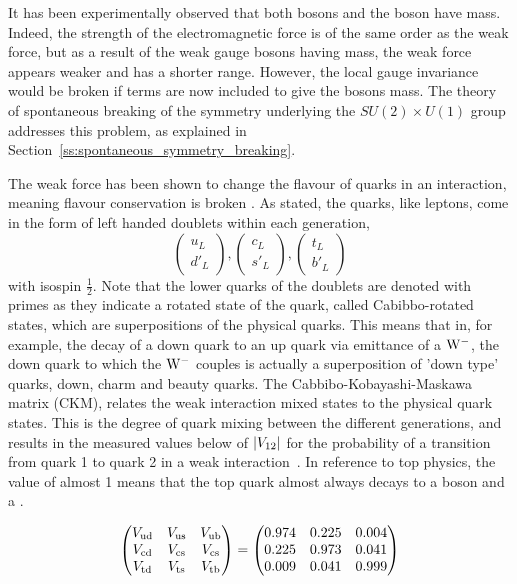 It has been experimentally observed that both \W bosons and the \Z boson have mass. Indeed, the
strength of the electromagnetic force is of the same order as the weak force, but as a result of the weak
gauge bosons having mass, the weak force appears weaker and has a shorter range. However, the local gauge
invariance would be broken if terms are now included to give the bosons mass. The theory of spontaneous
breaking of the symmetry underlying the $SU(2) \times U(1)$ group addresses this problem, as explained in
Section~\ref{ss:spontaneous_symmetry_breaking}.

The weak force has been shown to change the flavour of quarks in an interaction, meaning flavour conservation
is broken \cite{}. As stated, the quarks, like leptons, come in the form of left handed doublets within each
generation,
\begin{equation}
\left(\begin{array}{c} u_{L} \\ d'_{L} \end{array}\right) , \left(\begin{array}{c} c_{L} \\ 
s'_{L} \end{array}\right) , \left(\begin{array}{c} t_{L} \\ b'_{L} \end{array}\right)
\end{equation}
with isospin $\frac{1}{2}$. Note that the lower quarks of the doublets are denoted with primes as they
indicate a rotated state of the quark, called Cabibbo-rotated states, which are superpositions of the physical quarks.
This means that in, for example, the decay of a down quark to an up quark via emittance of a $\mathrm{W}^{-}$, the
down quark to which the $\mathrm{W}^{-}$ couples is actually a superposition of 'down type' quarks, \ie down, charm and
beauty quarks. The Cabbibo-Kobayashi-Maskawa matrix (CKM), relates the weak interaction mixed states to the
physical quark states. This is the degree of quark mixing between the different generations, and results in
the measured values below of $\lvert V_{12} \rvert$ for the probability of a transition from quark 1 to quark
2 in a weak interaction~\cite{Agashe:2014kda}. In reference to top physics, the  value of almost 1
means that the top quark almost always decays to a \W boson and a \bquark.

\begin{equation}
\begin{pmatrix}
V_{\mathrm{u}\mathrm{d}} & V_{\mathrm{u}\mathrm{s}} & V_{\mathrm{u}\mathrm{b}} \\
V_{\mathrm{c}\mathrm{d}} & V_{\mathrm{c}\mathrm{s}} & V_{\mathrm{c}\mathrm{s}} \\
V_{\mathrm{t}\mathrm{d}} & V_{\mathrm{t}\mathrm{s}} & V_{\mathrm{t}\mathrm{b}} 
\end{pmatrix}
=
\begin{pmatrix}
0.974 & 0.225 & 0.004 \\
0.225 & 0.973 & 0.041 \\
0.009 & 0.041 & 0.999
\end{pmatrix}
\end{equation}


